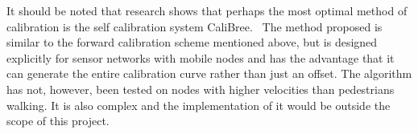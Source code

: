 It should be noted that research shows that perhaps the most optimal method of calibration is the self calibration system CaliBree.~\cite{calibree} The method proposed is similar to the forward calibration scheme mentioned above, but is designed explicitly for sensor networks with mobile nodes and has the advantage that it can generate the entire calibration curve rather than just an offset. The algorithm has not, however, been tested on nodes with higher velocities than pedestrians walking. It is also complex and the implementation of it would be outside the scope of this project. 

